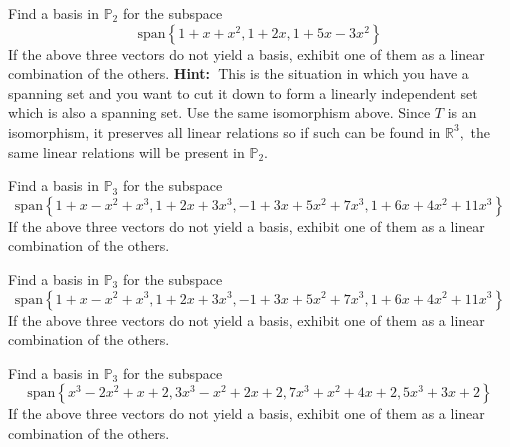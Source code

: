 \documentclass{ximera}
\begin{document}
\begin{problem}\label{prb:10.29} Find a basis in $\mathbb{P}_{2}$ for the subspace
\begin{equation*}
\mbox{span}\left\{ 1+x+x^{2},1+2x,1+5x-3x^{2}\right\}
\end{equation*}
If the above three vectors do not yield a basis, exhibit one of them as a
linear combination of the others. \textbf{Hint:\ }This is the situation in
which you have a spanning set and you want to cut it down to form a linearly
independent set which is also a spanning set. Use the same isomorphism
above. Since $T$ is an isomorphism, it preserves all linear relations so if
such can be found in $\mathbb{R}^{3},$ the same linear relations will be
present in $\mathbb{P}_{2}$.
\end{problem}


\begin{problem}\label{prb:10.30} Find a basis in $\mathbb{P}_{3}$ for the subspace
\begin{equation*}
\mbox{span}\left\{
1+x-x^{2}+x^{3},1+2x+3x^{3},-1+3x+5x^{2}+7x^{3},1+6x+4x^{2}+11x^{3}\right\}
\end{equation*}
If the above three vectors do not yield a basis, exhibit one of them as a
linear combination of the others.
\end{problem}


\begin{problem}\label{prb:10.31} Find a basis in $\mathbb{P}_{3}$ for the subspace
\begin{equation*}
\mbox{span}\left\{
1+x-x^{2}+x^{3},1+2x+3x^{3},-1+3x+5x^{2}+7x^{3},1+6x+4x^{2}+11x^{3}\right\}
\end{equation*}
If the above three vectors do not yield a basis, exhibit one of them as a
linear combination of the others.
\end{problem}


\begin{problem}\label{prb:10.32} Find a basis in $\mathbb{P}_{3}$ for the subspace
\begin{equation*}
\mbox{span}\left\{
x^{3}-2x^{2}+x+2,3x^{3}-x^{2}+2x+2,7x^{3}+x^{2}+4x+2,5x^{3}+3x+2\right\}
\end{equation*}
If the above three vectors do not yield a basis, exhibit one of them as a
linear combination of the others.
\end{problem}
\end{document}
